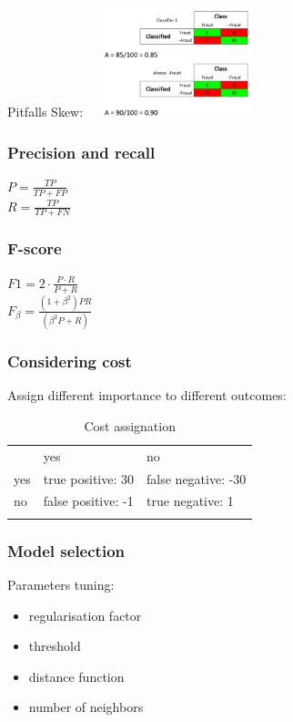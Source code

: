 Pitfalls
Skew:
\includegraphics[width=200px, height=120px]{accpitskew}

\subsubsection{Precision and recall}
$ P = \frac{TP}{TP + FP} $ \\
$ R = \frac{TP}{TP + FN} $

\subsubsection{F-score}
$ F1 = 2 \cdot \frac{P \cdot R}{P + R} $ \\
$ F_\beta = \frac{(1 + \beta^2)P R}{(\beta^2 P + R)}$

\subsubsection{Considering cost}

Assign different importance to different outcomes:

\begin{table}[htp]
  \centering
  \caption{Cost assignation}
  \label{cost}
  \begin{tabular}{lll}
    & yes                & no                  \\
    yes & true positive: 30  & false negative: -30 \\
    no  & false positive: -1 & true negative: 1    \\
    &                    &
  \end{tabular}
\end{table}

\subsubsection{Model selection}
Parameters tuning:
\begin{itemize}
\item regularisation factor
\item threshold
\item distance function
\item number of neighbors
\end{itemize}

